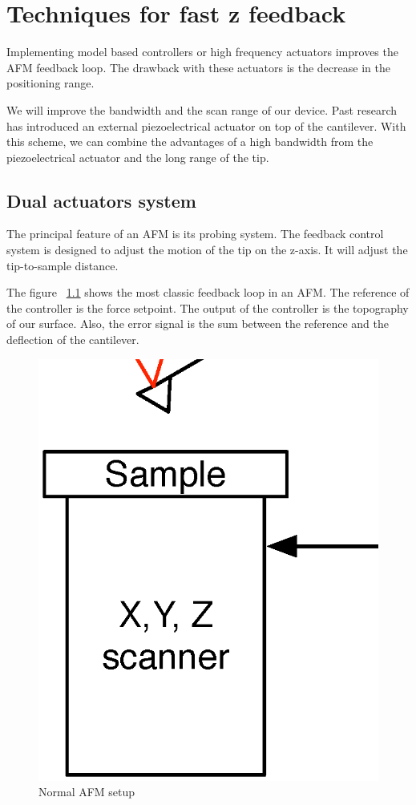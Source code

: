 \chapter{Techniques for fast z feedback}

Implementing model based controllers or high frequency actuators improves the AFM feedback loop\cite{sulchek1999dual}. The drawback with these actuators is the decrease in the positioning range.

We will improve the bandwidth and the scan range of our device. Past research has introduced an external piezoelectrical actuator on top of the cantilever. With this scheme, we can combine the advantages of a high bandwidth from the piezoelectrical actuator and the long range of the tip.

\section{Dual actuators system}
\label{sec:dualactuator}
The principal feature of an AFM is its probing system. The feedback control system is designed to adjust the motion of the tip on the z-axis. It will adjust the tip-to-sample distance. 

The figure ~\ref{fig:normalAFM} shows the most classic feedback loop in an AFM. The reference of the controller is the force setpoint. The output of the controller is the topography of our surface. Also, the error signal is the sum between the reference and the deflection of the cantilever.

\begin{figure}[!htb]
  \centering
  \includegraphics[scale=0.3]{images/normalafm.eps}
    \caption{Normal AFM setup}
  \label{fig:normalAFM}
\end{figure}


